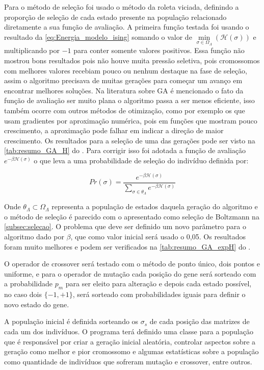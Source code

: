 Para o método de seleção foi usado o método da roleta viciada, definindo a proporção de seleção de cada estado presente na população relacionado diretamente a sua função de avaliação. A primeira função testada foi usando o resultado da \autoref{eq:Energia_modelo_ising} somando o valor de \(\min\limits_{\sigma \in \Omega_{\Lambda}}(\mathcal{H}(\sigma))\) e multiplicando por \(-1\) para conter somente valores positivos. Essa função não mostrou bons resultados pois não houve muita pressão seletiva, pois cromossomos com melhores valores recebiam pouco ou nenhum destaque na fase de seleção, assim o algoritmo precisava de muitas gerações para começar um avanço em encontrar melhores soluções. Na literatura sobre GA é mencionado o fato da função de avaliação ser muito plana o algoritmo passa a ser menos eficiente, isso também ocorre com outros métodos de otimização, como por exemplo os que usam gradientes por aproximação numérica, pois em funções que mostram pouco crescimento, a aproximação pode falhar em indicar a direção de maior crescimento. Os resultados para a seleção de uma das gerações pode ser visto na \autoref{tab:resumo_GA_H} do . Para corrigir isso foi adotada a função de avaliação \(e^{-\beta \mathcal{H}(\sigma)} \) o que leva a uma probabilidade de seleção do indivíduo definida por:

\begin{equation}
Pr(\sigma) = \frac{e^{-\beta \mathcal{H}(\sigma)}}{\sum\limits_{\sigma \in \theta_{\Lambda}}e^{-\beta \mathcal{H}(\sigma)}}
\label{eq:selecao_modelo_ising}
\end{equation}

Onde \(\theta_{\Lambda} \subset \Omega_{\Lambda} \) representa a população de estados daquela geração do algoritmo e o método de seleção é parecido com o apresentado como seleção de Boltzmann na \autoref{subsec:selecao}. O problema que deve ser definido um novo parâmetro para o algoritmo dado por \(\beta \), que como valor inicial será usado o 0,05. Os resultados foram muito melhores e podem ser verificados na \autoref{tab:resumo_GA_expH} do .

O operador de crossover será testado com o método de ponto único, dois pontos e uniforme, e para o operador de mutação cada posição do gene será sorteado com a probabilidade \(p_m\) para ser eleito para alteração e depois cada estado possível, no caso dois \(\{ -1, +1\}\), será sorteado com probabilidades iguais para definir o novo estado do gene.

A população inicial é definida sorteando os \(\sigma_s\) de cada posição das matrizes de cada um dos indivíduos. O programa terá definido uma classe para a população que é responsável por criar a geração inicial aleatória, controlar aspectos sobre a geração como melhor e pior cromossomo e algumas estatísticas sobre a população como quantidade de indivíduos que sofreram mutação e crossover, entre outros. 

